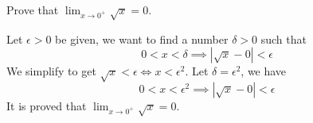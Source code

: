 \begin{problem}
    Prove that \(\lim_{x\to 0^+}\sqrt{x}=0\).
\end{problem}
\begin{solution}
    Let \(\epsilon>0\) be given, we want to find a number \(\delta>0\) such
    that
    \[0<x<\delta\implies|\sqrt{x}-0|<\epsilon\]
    We simplify to get \(\sqrt{x}<\epsilon\iff x<\epsilon^2\).
    Let \(\delta=\epsilon^2\), we have
    \[0<x<\epsilon^2\implies|\sqrt{x}-0|<\epsilon\]
    It is proved that \(\lim_{x\to 0^+}\sqrt{x}=0\).
\end{solution}